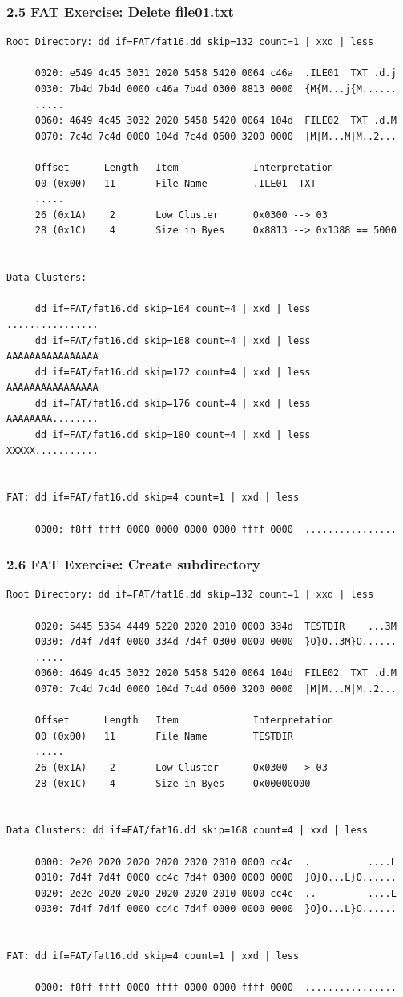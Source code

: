 \begin{frame}[fragile]
  \frametitle{2.5 FAT Exercise: Delete file01.txt}
  \begin{lstlisting}[basicstyle=\tiny]
Root Directory: dd if=FAT/fat16.dd skip=132 count=1 | xxd | less

     0020: e549 4c45 3031 2020 5458 5420 0064 c46a  .ILE01  TXT .d.j
     0030: 7b4d 7b4d 0000 c46a 7b4d 0300 8813 0000  {M{M...j{M......
     .....
     0060: 4649 4c45 3032 2020 5458 5420 0064 104d  FILE02  TXT .d.M
     0070: 7c4d 7c4d 0000 104d 7c4d 0600 3200 0000  |M|M...M|M..2...
  
     Offset      Length   Item             Interpretation
     00 (0x00)   11       File Name        .ILE01  TXT
     .....
     26 (0x1A)    2       Low Cluster      0x0300 --> 03
     28 (0x1C)    4       Size in Byes     0x8813 --> 0x1388 == 5000


Data Clusters:

     dd if=FAT/fat16.dd skip=164 count=4 | xxd | less    ................
     dd if=FAT/fat16.dd skip=168 count=4 | xxd | less    AAAAAAAAAAAAAAAA
     dd if=FAT/fat16.dd skip=172 count=4 | xxd | less    AAAAAAAAAAAAAAAA
     dd if=FAT/fat16.dd skip=176 count=4 | xxd | less    AAAAAAAA........
     dd if=FAT/fat16.dd skip=180 count=4 | xxd | less    XXXXX...........


FAT: dd if=FAT/fat16.dd skip=4 count=1 | xxd | less

     0000: f8ff ffff 0000 0000 0000 0000 ffff 0000  ................
\end{lstlisting}
\end{frame}


\begin{frame}[fragile]
  \frametitle{2.6 FAT Exercise: Create subdirectory}
  \begin{lstlisting}[basicstyle=\tiny]
Root Directory: dd if=FAT/fat16.dd skip=132 count=1 | xxd | less

     0020: 5445 5354 4449 5220 2020 2010 0000 334d  TESTDIR    ...3M
     0030: 7d4f 7d4f 0000 334d 7d4f 0300 0000 0000  }O}O..3M}O......
     .....
     0060: 4649 4c45 3032 2020 5458 5420 0064 104d  FILE02  TXT .d.M
     0070: 7c4d 7c4d 0000 104d 7c4d 0600 3200 0000  |M|M...M|M..2...
  
     Offset      Length   Item             Interpretation
     00 (0x00)   11       File Name        TESTDIR   
     .....
     26 (0x1A)    2       Low Cluster      0x0300 --> 03
     28 (0x1C)    4       Size in Byes     0x00000000

  
Data Clusters: dd if=FAT/fat16.dd skip=168 count=4 | xxd | less

     0000: 2e20 2020 2020 2020 2020 2010 0000 cc4c  .          ....L
     0010: 7d4f 7d4f 0000 cc4c 7d4f 0300 0000 0000  }O}O...L}O......
     0020: 2e2e 2020 2020 2020 2020 2010 0000 cc4c  ..         ....L
     0030: 7d4f 7d4f 0000 cc4c 7d4f 0000 0000 0000  }O}O...L}O......


FAT: dd if=FAT/fat16.dd skip=4 count=1 | xxd | less

     0000: f8ff ffff 0000 ffff 0000 0000 ffff 0000  ................
\end{lstlisting}
\end{frame}


